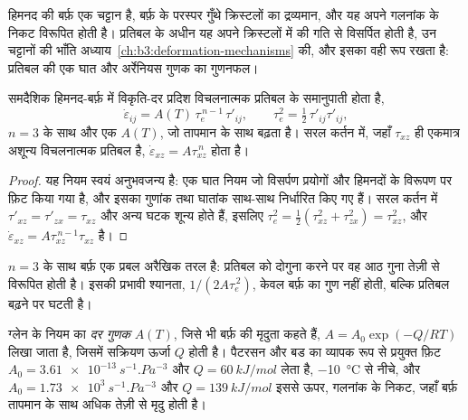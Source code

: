 हिमनद की बर्फ़ एक चट्टान है, बर्फ़ के परस्पर गुँथे क्रिस्टलों का द्रव्यमान, और
यह अपने गलनांक के निकट विरूपित होती है। प्रतिबल के अधीन यह
अपने क्रिस्टलों में  की गति से विसर्पित होती है, उन चट्टानों की भाँति
अध्याय~\ref{ch:b3:deformation-mechanisms} की, और इसका  वही
रूप रखता है: प्रतिबल की एक घात और अर्रेनियस गुणक का गुणनफल।

\begin{theorem}[ग्लेन का प्रवाह नियम]\label{thm:b3:glaciology:glen}
समदैशिक हिमनद-बर्फ़ में विकृति-दर प्रदिश
विचलनात्मक प्रतिबल के समानुपाती होता है,
\[
\dot\varepsilon_{ij} = A(T)\,\tau_e^{\,n-1}\,\tau'_{ij}, \qquad
\tau_e^2 = \tfrac12\,\tau'_{ij}\tau'_{ij},
\]
$n = 3$ के साथ और एक  $A(T)$, जो तापमान के साथ बढ़ता है।
सरल कर्तन में, जहाँ $\tau_{xz}$ ही एकमात्र अशून्य विचलनात्मक प्रतिबल है,
$\dot\varepsilon_{xz} = A\tau_{xz}^{\,n}$ होता है।
\end{theorem}

\begin{proof}
यह नियम स्वयं अनुभवजन्य है: एक घात नियम जो विसर्पण प्रयोगों और
हिमनदों के विरूपण पर फ़िट किया गया है, और इसका गुणांक तथा घातांक
साथ-साथ निर्धारित किए गए हैं। सरल कर्तन में $\tau'_{xz} = \tau'_{zx} = \tau_{xz}$ और
अन्य घटक शून्य होते हैं, इसलिए $\tau_e^2 = \tfrac12(\tau_{xz}^2 +
\tau_{zx}^2) = \tau_{xz}^2$, और $\dot\varepsilon_{xz} = A\tau_{xz}^{\,n-1}
\tau_{xz}$ है।
\end{proof}

$n = 3$ के साथ बर्फ़ एक प्रबल अरैखिक तरल है: प्रतिबल को दोगुना करने पर वह
आठ गुना तेज़ी से विरूपित होती है। इसकी प्रभावी श्यानता, $1/(2A\tau_e^{\,2})$,
केवल बर्फ़ का गुण नहीं होती, बल्कि प्रतिबल बढ़ने पर घटती है।

\begin{definition}[दर गुणक (बर्फ़)]\label{def:b3:glaciology:glen}
ग्लेन के नियम का \emph{दर गुणक} $A(T)$, जिसे भी
बर्फ़ की मृदुता कहते हैं, $A = A_0\exp(-Q/RT)$ लिखा जाता है, जिसमें
सक्रियण ऊर्जा $Q$ होती है। पैटरसन और बड का व्यापक रूप से प्रयुक्त फ़िट $A_0 =
\qty{3.61e-13}{s^{-1}.Pa^{-3}}$ और $Q = \qty{60}{kJ/mol}$ लेता है, \qty{-10}{\celsius}
से नीचे, और $A_0 = \qty{1.73e3}{s^{-1}.Pa^{-3}}$ और $Q =
\qty{139}{kJ/mol}$ इससे ऊपर, गलनांक के निकट, जहाँ बर्फ़
तापमान के साथ अधिक तेज़ी से मृदु होती है।
\end{definition}

